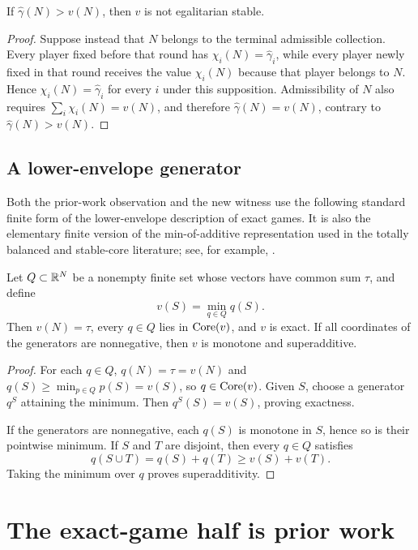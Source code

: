 \begin{lemma}\label{lem:oversum}
If $\widehat\gamma(N)>v(N)$, then $v$ is not egalitarian stable.
\end{lemma}

\begin{proof}
Suppose instead that $N$ belongs to the terminal admissible collection. Every
player fixed before that round has $\chi_i(N)=\widehat\gamma_i$, while every
player newly fixed in that round receives the value $\chi_i(N)$ because that
player belongs to $N$. Hence $\chi_i(N)=\widehat\gamma_i$ for every $i$ under
this supposition. Admissibility of $N$ also requires
$\sum_i\chi_i(N)=v(N)$, and therefore $\widehat\gamma(N)=v(N)$, contrary to
$\widehat\gamma(N)>v(N)$.
\end{proof}

\subsection{A lower-envelope generator}

Both the prior-work observation and the new witness use the following
standard finite form of the lower-envelope description of exact games. It is
also the elementary finite version of the min-of-additive representation used
in the totally balanced and stable-core literature; see, for example,
\citet{Shellshear2009}.

\begin{lemma}\label{lem:generator}
Let $Q\subset\mathbb{R}^N$ be a nonempty finite set whose vectors have common sum
$\tau$, and define
\[
 v(S)=\min_{q\in Q}q(S).
\]
Then $v(N)=\tau$, every $q\in Q$ lies in $\operatorname{Core}(v)$, and $v$ is exact. If all
coordinates of the generators are nonnegative, then $v$ is monotone and
superadditive.
\end{lemma}

\begin{proof}
For each $q\in Q$, $q(N)=\tau=v(N)$ and
$q(S)\ge\min_{p\in Q}p(S)=v(S)$, so $q\in\operatorname{Core}(v)$. Given $S$, choose a
generator $q^S$ attaining the minimum. Then
$q^S(S)=v(S)$, proving exactness.

If the generators are nonnegative, each $q(S)$ is monotone in $S$, hence so
is their pointwise minimum. If $S$ and $T$ are disjoint, then every $q\in Q$
satisfies
\[
 q(S\cup T)=q(S)+q(T)\ge v(S)+v(T).
\]
Taking the minimum over $q$ proves superadditivity.
\end{proof}


\section{The exact-game half is prior work}
\label{sec:exact-prior}

